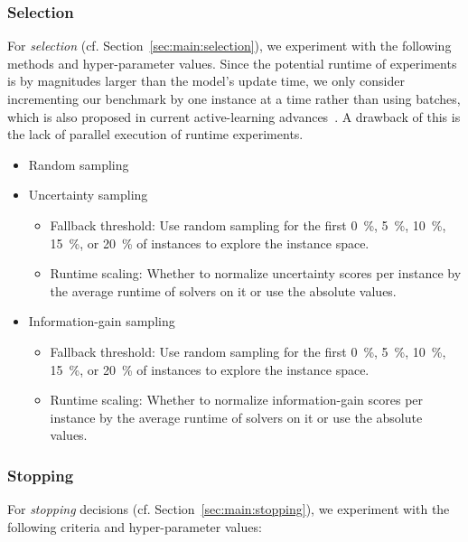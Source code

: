 \documentclass[sn-basic, Numbered]{sn-jnl} %
\begin{document}
\subsubsection{Selection}

For \emph{selection} (cf. Section~\ref{sec:main:selection}), we experiment with the following methods and hyper-parameter values.
Since the potential runtime of experiments is by magnitudes larger than the model's update time, we only consider incrementing our benchmark by one instance at a time rather than using batches, which is also proposed in current active-learning advances~\cite{SinhaED19,2019gaal}.
A drawback of this is the lack of parallel execution of runtime experiments.

\begin{itemize}
  \item Random sampling 
  \item Uncertainty sampling
  \begin{itemize}
    \item Fallback threshold: Use random sampling for the first \SI{0}{\%}, \SI{5}{\%}, \SI{10}{\%}, \SI{15}{\%}, or \SI{20}{\%} of instances to explore the instance space.
    \item Runtime scaling: Whether to normalize uncertainty scores per instance by the average runtime of solvers on it or use the absolute values.
  \end{itemize}

  \item Information-gain sampling
  \begin{itemize}
    \item Fallback threshold: Use random sampling for the first \SI{0}{\%}, \SI{5}{\%}, \SI{10}{\%}, \SI{15}{\%}, or \SI{20}{\%} of instances to explore the instance space.
    \item Runtime scaling: Whether to normalize information-gain scores per instance by the average runtime of solvers on it or use the absolute values.
  \end{itemize}
\end{itemize}

\subsubsection{Stopping}

For \emph{stopping} decisions (cf. Section~\ref{sec:main:stopping}), we experiment with the following criteria and hyper-parameter values:
\end{document}
